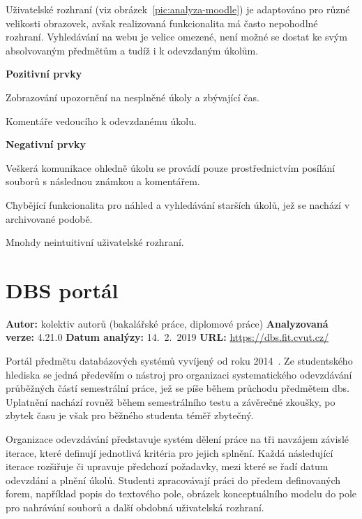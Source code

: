 Uživatelské rozhraní (viz obrázek~\ref{pic:analyza-moodle}) je adaptováno pro různé velikosti obrazovek, avšak realizovaná funkcionalita má často nepohodlné rozhraní. Vyhledávání na webu je velice omezené, není možné se dostat ke svým absolvovaným předmětům a tudíž i k odevzdaným úkolům.

\textbf{Pozitivní prvky}
\begin{ul}
   \item Zobrazování upozornění na nesplněné úkoly a zbývající čas.
   \item Komentáře vedoucího k odevzdanému úkolu.
\end{ul}

\textbf{Negativní prvky}
\begin{ul}
   \item Veškerá komunikace ohledně úkolu se provádí pouze prostřednictvím posílání souborů s následnou známkou a komentářem.
   \item Chybějící funkcionalita pro náhled a vyhledávání starších úkolů, jež se nachází v archivované podobě.
   \item Mnohdy neintuitivní uživatelské rozhraní.
\end{ul}




\section{DBS portál}

\textbf{Autor:} kolektiv autorů (bakalářské práce, diplomové práce)\newline
\textbf{Analyzovaná verze:} 4.21.0\newline
\textbf{Datum analýzy:} 14.~2.~2019\newline
\textbf{URL:} \url{https://dbs.fit.cvut.cz/}

Portál předmětu databázových systémů vyvíjený od roku 2014~\cite{dbsAuthors}. Ze studentského hlediska se jedná především o nástroj pro organizaci systematického odevzdávání průběžných částí semestrální práce, jež se píše během průchodu předmětem \gls{dbs}. Uplatnění nachází rovněž během semestrálního testu a závěrečné zkoušky, po zbytek času je však pro běžného studenta téměř zbytečný.

Organizace odevzdávání představuje systém dělení práce na tři navzájem závislé iterace, které definují jednotlivá kritéria pro jejich splnění. Každá následující iterace rozšiřuje či upravuje předchozí požadavky, mezi které se řadí datum odevzdání a plnění úkolů. Studenti zpracovávají práci do předem definovaných forem, například popis do textového pole, obrázek konceptuálního modelu do pole pro nahrávání souborů a další obdobná uživatelská rozhraní.

